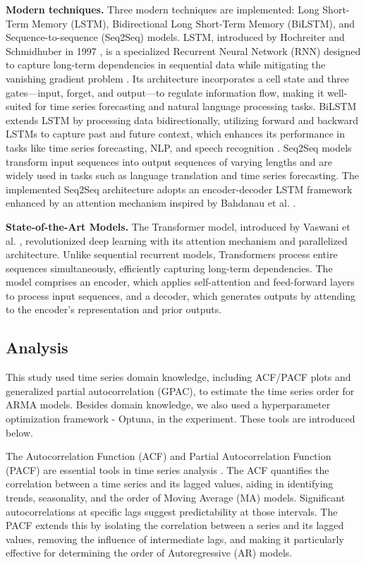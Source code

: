\documentclass[sn-mathphys-num]{sn-jnl}
\theoremstyle{thmstyleone}%
\theoremstyle{thmstyletwo}%
\theoremstyle{thmstylethree}%
\begin{document}
\textbf{Modern techniques.}
Three modern techniques are implemented: Long Short-Term Memory (LSTM), Bidirectional Long Short-Term Memory (BiLSTM), and Sequence-to-sequence (Seq2Seq) models. 
LSTM, introduced by Hochreiter and Schmidhuber in 1997 \cite{hochreiter1997lstm}, is a specialized Recurrent Neural Network (RNN) designed to capture long-term dependencies in sequential data while mitigating the vanishing gradient problem \cite{medsker2001recurrent}. Its architecture incorporates a cell state and three gates—input, forget, and output—to regulate information flow, making it well-suited for time series forecasting and natural language processing tasks. BiLSTM extends LSTM by processing data bidirectionally, utilizing forward and backward LSTMs to capture past and future context, which enhances its performance in tasks like time series forecasting, NLP, and speech recognition \cite{graves2005framewise}. Seq2Seq models transform input sequences into output sequences of varying lengths and are widely used in tasks such as language translation and time series forecasting. The implemented Seq2Seq architecture adopts an encoder-decoder LSTM framework enhanced by an attention mechanism inspired by Bahdanau et al. \cite{bahdanau2014neural}.

\textbf{State-of-the-Art Models.} The Transformer model, introduced by Vaswani et al. \cite{vaswani2017attention}, revolutionized deep learning with its attention mechanism and parallelized architecture. Unlike sequential recurrent models, Transformers process entire sequences simultaneously, efficiently capturing long-term dependencies. The model comprises an encoder, which applies self-attention and feed-forward layers to process input sequences, and a decoder, which generates outputs by attending to the encoder’s representation and prior outputs.

\subsection{Analysis}
This study used time series domain knowledge, including ACF/PACF plots and generalized partial autocorrelation (GPAC), to estimate the time series order for ARMA models. Besides domain knowledge, we also used a hyperparameter optimization framework - Optuna, in the experiment. These tools are introduced below. 

The Autocorrelation Function (ACF) and Partial Autocorrelation Function (PACF) are essential tools in time series analysis \cite{box2015time, hyndman2018forecasting, chatfield2019analysis}. The ACF quantifies the correlation between a time series and its lagged values, aiding in identifying trends, seasonality, and the order of Moving Average (MA) models. Significant autocorrelations at specific lags suggest predictability at those intervals. The PACF extends this by isolating the correlation between a series and its lagged values, removing the influence of intermediate lags, and making it particularly effective for determining the order of Autoregressive (AR) models.
\end{document}
